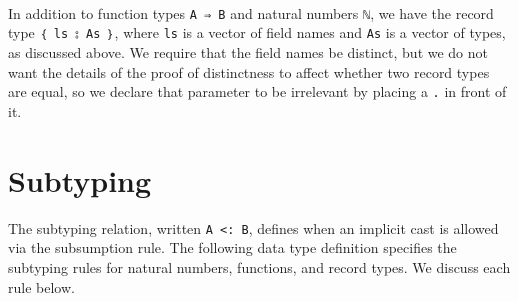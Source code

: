 \begin{fence}
\begin{code}%
\>[0]\AgdaSpace{}%
\AgdaSpace{}%
\AgdaSymbol{:}\AgdaSpace{}%
\AgdaSpace{}%
\<%
\\
\>[0][@{}l@{\AgdaIndent{0}}]%
\>[2]%
\>[8]\AgdaSymbol{:}\AgdaSpace{}%
\AgdaSpace{}%
\AgdaSpace{}%
\AgdaSpace{}%
\AgdaSpace{}%
\<%
\\
%
\>[2]%
\>[8]\AgdaSymbol{:}\AgdaSpace{}%
\<%
\\
%
\>[2]\AgdaSpace{}%
\AgdaSymbol{:}\AgdaSpace{}%
\AgdaSymbol{\{}\AgdaSpace{}%
\AgdaSymbol{:}\AgdaSpace{}%
\AgdaSymbol{\}}\AgdaSpace{}%
\AgdaSymbol{(}\AgdaSpace{}%
\AgdaSymbol{:}\AgdaSpace{}%
\AgdaSpace{}%
\AgdaSpace{}%
\AgdaSymbol{)}\AgdaSpace{}%
\AgdaSymbol{(}\AgdaSpace{}%
\AgdaSymbol{:}\AgdaSpace{}%
\AgdaSpace{}%
\AgdaSpace{}%
\AgdaSymbol{)}\AgdaSpace{}%
\AgdaSpace{}%
\AgdaSpace{}%
\AgdaSymbol{:}\AgdaSpace{}%
\AgdaSpace{}%
\AgdaSymbol{\}}\AgdaSpace{}%
\AgdaSpace{}%
\<%
\end{code}
\end{fence}

In addition to function types \texttt{A\ ⇒\ B} and natural numbers
\texttt{ℕ}, we have the record type \texttt{｛\ ls\ ⦂\ As\ ｝}, where
\texttt{ls} is a vector of field names and \texttt{As} is a vector of
types, as discussed above. We require that the field names be distinct,
but we do not want the details of the proof of distinctness to affect
whether two record types are equal, so we declare that parameter to be
irrelevant by placing a \texttt{.} in front of it.

\hypertarget{subtyping}{%
\section{Subtyping}\label{subtyping}}

The subtyping relation, written \texttt{A\ \textless{}:\ B}, defines
when an implicit cast is allowed via the subsumption rule. The following
data type definition specifies the subtyping rules for natural numbers,
functions, and record types. We discuss each rule below.

